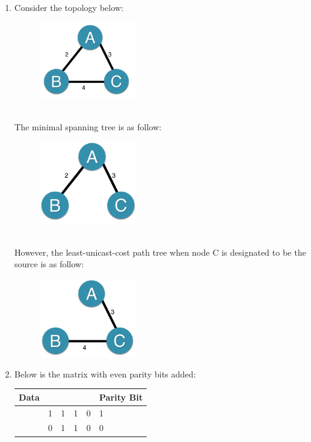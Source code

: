 \documentclass[12pt]{article}
\begin{document}
\begin{singlespace}
\begin{enumerate}
\item Consider the topology below:
	\begin{figure}[h]
	\centering
	\includegraphics[width=0.4\textwidth]{2a} 
	\end{figure}\\
	The minimal spanning tree is as follow:
	\begin{figure}[h]
	\centering
	\includegraphics[width=0.4\textwidth]{2b} 
	\end{figure}\\
	However, the least-unicast-cost path tree when node C is designated to be the source is as follow:
	\begin{figure}[h]
	\centering
	\includegraphics[width=0.4\textwidth]{2c} 
	\end{figure}
\item Below is the matrix with even parity bits added:
	\begin{table}[h]
	\centering
	\begin{tabular}{|l|l|l|l|l|l|}
	\hline
	Data       &   &   &   &   & Parity Bit \\ \hline
	           & 1 & 1 & 1 & 0 & 1          \\ \hline
	           & 0 & 1 & 1 & 0 & 0          \\ \hline

\end{tabular}
\end{table}
\end{enumerate}
\end{singlespace}
\end{document}
